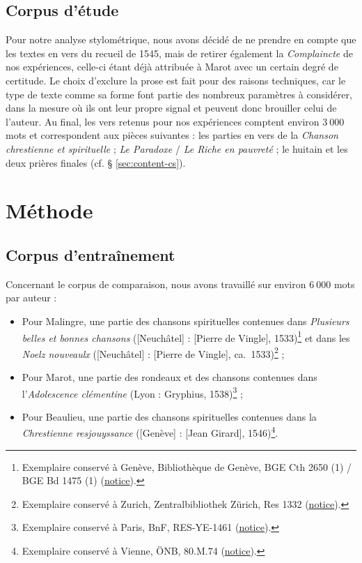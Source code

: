 \documentclass[final, fra]{anthology-ch}
\begin{document}
\subsection{Corpus d'étude}
Pour notre analyse stylométrique, nous avons décidé de ne prendre en compte que les textes en vers du recueil de 1545, mais de retirer également la \textit{Complaincte} de nos expériences, celle-ci étant déjà attribuée à Marot avec un certain degré de certitude.
Le choix d'exclure la prose est fait pour des raisons techniques, car le type de texte comme sa forme font partie des nombreux paramètres à considérer, dans la mesure où ils ont leur propre signal et peuvent donc brouiller celui de l'auteur.
Au final, les vers retenus pour nos expériences comptent environ $3~000$ mots et correspondent aux pièces suivantes : les parties en vers de la \textit{Chanson chrestienne et spirituelle} ; \textit{Le Paradoxe} / \textit{Le Riche en pauvreté} ; le huitain et les deux prières finales (cf. § \ref{sec:content-cs}).

\section{Méthode} \label{sec:method-training}

\subsection{Corpus d'entraînement}
Concernant le corpus de comparaison, nous avons travaillé sur environ $6~000$ mots par auteur :

\begin{itemize}
    \item Pour Malingre, une partie des chansons spirituelles contenues dans \textit{Plusieurs belles et bonnes chansons} ([Neuchâtel] : [Pierre de Vingle], 1533)\footnote{Exemplaire conservé à Genève, Bibliothèque de Genève, BGE Cth 2650 (1) / BGE Bd 1475 (1) (\href{https://swisscovery.slsp.ch/permalink/41SLSP_UGE/cao1fn/alma991031959519705501}{\underline{notice}}). %
    } et dans les \textit{Noelz nouveaulx} ([Neuchâtel] : [Pierre de Vingle], ca.~1533)\footnote{Exemplaire conservé à Zurich, Zentralbibliothek Zürich, Res 1332 (\href{https://swisscovery.slsp.ch/permalink/41SLSP_UGE/hou1g5/alma991050231369705501}{\underline{notice}}). %
    } ;
    \item Pour Marot, une partie des rondeaux et des chansons contenues dans l'\textit{Adolescence clémentine} (Lyon : Gryphius, 1538)\footnote{Exemplaire conservé à Paris, BnF, RES-YE-1461 (\href{https://catalogue.bnf.fr/ark:/12148/cb30888593j}{\underline{notice}}). %
    } ;
    \item Pour Beaulieu, une partie des chansons spirituelles contenues dans la \textit{Chrestienne resjouyssance} ([Genève] : [Jean Girard], 1546)\footnote{Exemplaire conservé à Vienne, ÖNB, 80.M.74 (\href{https://search.onb.ac.at/permalink/f/sb7jht/ONB_alma21282574320003338}{\underline{notice}}). %
    }.
\end{itemize}
\end{document}

